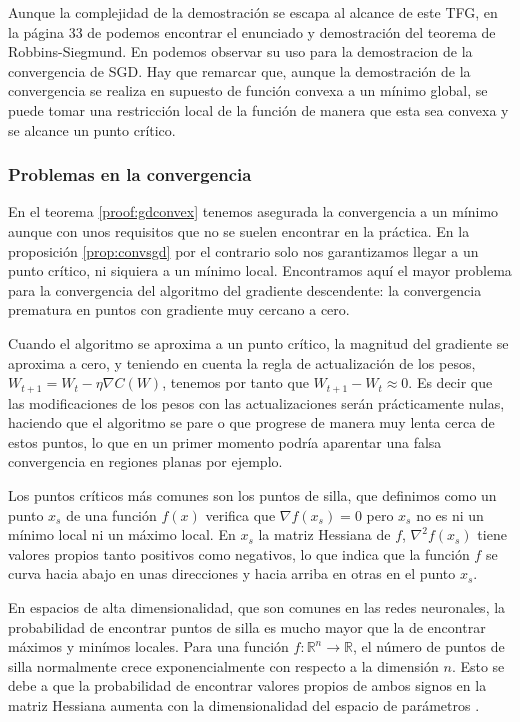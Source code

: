 Aunque la complejidad de la demostración se escapa al alcance de este TFG, en la página 33 de \cite{RobbinSiegmund} podemos encontrar el enunciado y demostración del teorema de Robbins-Siegmund. En \cite{RobbinSiegmundtoSGD} podemos observar su uso para la demostracion de la convergencia de SGD. Hay que remarcar que, aunque la demostración de la convergencia se realiza en supuesto de función convexa a un mínimo global, se puede tomar una restricción local de la función de manera que esta sea convexa y se alcance un punto crítico.



\subsubsection{Problemas en la convergencia}


En el teorema \ref{proof:gdconvex} tenemos asegurada la convergencia a un mínimo aunque con unos requisitos que no se suelen encontrar en la práctica. En la proposición \ref{prop:convsgd} por el contrario solo nos garantizamos llegar a un punto crítico, ni siquiera a un mínimo local. Encontramos aquí el mayor problema para la convergencia del algoritmo del gradiente descendente: la convergencia prematura en puntos con gradiente muy cercano a cero. 

Cuando el algoritmo se aproxima a un punto crítico, la magnitud del gradiente se aproxima a cero, y teniendo en cuenta la regla de actualización de los pesos, $W_{t+1}=W_t - \eta \nabla C(W)$, tenemos por tanto que $W_{t+1} - W_t \approx 0$. Es decir que las modificaciones de los pesos con las actualizaciones serán prácticamente nulas, haciendo que el algoritmo se pare o que progrese de manera muy lenta cerca de estos puntos, lo que en un primer momento podría aparentar una falsa convergencia en regiones planas por ejemplo. 

Los puntos críticos más comunes son los puntos de silla, que definimos como un punto $x_s$ de una función $f(x)$ verifica que $\nabla f(x_s)=0$ pero $x_s$ no es ni un mínimo local ni un máximo local. En $x_s$ la matriz Hessiana de $f$, $\nabla^2 f(x_s)$ tiene valores propios tanto positivos como negativos, lo que indica que la función $f$ se curva hacia abajo en unas direcciones y hacia arriba en otras en el punto $x_s$.

En espacios de alta dimensionalidad, que son comunes en las redes neuronales, la probabilidad de encontrar puntos de silla es mucho mayor que la de encontrar máximos y minímos locales. Para una función $f:\mathbb{R}^n \rightarrow \mathbb{R}$, el número de puntos de silla normalmente crece exponencialmente con respecto a la dimensión $n$. Esto se debe a que la probabilidad de encontrar valores propios de ambos signos en la matriz Hessiana aumenta con la dimensionalidad del espacio de parámetros \cite{dauphin2014SaddlePoints}. 

